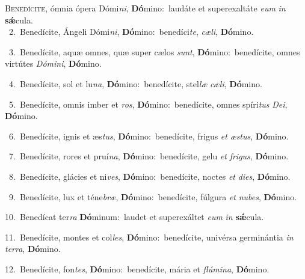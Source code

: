 \lettrine{\initial\textcolor{\initialcolor}{B}}{enedícite,} ómnia ópera Dómi\-\textit{ni}\-, \textbf{Dó}\-mino:~\star laudáte et superexaltáte \textit{e}\-\textit{um} \textit{in} \textbf{sǽ}\-cula.\\
{\numbfont\textcolor{\numbcolor}{~2.}}~Benedícite, Ángeli Dómi\-\textit{ni}\-, \textbf{Dó}\-mino:~\star benedíci\-\textit{te}\-, \textit{cæ}\-\textit{li}, \textbf{Dó}\-mino.\par
{\numbfont\textcolor{\numbcolor}{~3.}}~Benedícite, aquæ omnes, quæ super cælos \textit{sunt}\-, \textbf{Dó}\-mino:~\star benedícite, omnes virtútes \textit{Dó}\-\textit{mi}\textit{ni}, \textbf{Dó}\-mino.\par
{\numbfont\textcolor{\numbcolor}{~4.}}~Benedícite, sol et lu\-\textit{na}\-, \textbf{Dó}\-mino:~\star benedícite, stel\textit{læ} \textit{cæ}\-\textit{li}, \textbf{Dó}\-mino.\par
{\numbfont\textcolor{\numbcolor}{~5.}}~Benedícite, omnis imber et \textit{ros}\-, \textbf{Dó}\-mino:~\star benedícite, omnes spíri\textit{tus} \textit{De}\-\textit{i}, \textbf{Dó}\-mino.\par
{\numbfont\textcolor{\numbcolor}{~6.}}~Benedícite, ignis et æs\-\textit{tus}\-, \textbf{Dó}\-mino:~\star benedícite, frigus \textit{et} \textit{æs}\-\textit{tus}, \textbf{Dó}\-mino.\par
{\numbfont\textcolor{\numbcolor}{~7.}}~Benedícite, rores et pruí\-\textit{na}\-, \textbf{Dó}\-mino:~\star benedícite, gelu \textit{et} \textit{fri}\-\textit{gus}, \textbf{Dó}\-mino.\par
{\numbfont\textcolor{\numbcolor}{~8.}}~Benedícite, glácies et ni\-\textit{ves}\-, \textbf{Dó}\-mino:~\star benedícite, noctes \textit{et} \textit{di}\-\textit{es}, \textbf{Dó}\-mino.\par
{\numbfont\textcolor{\numbcolor}{~9.}}~Benedícite, lux et téne\-\textit{bræ}\-, \textbf{Dó}\-mino:~\star benedícite, fúlgura \textit{et} \textit{nu}\-\textit{bes}, \textbf{Dó}\-mino.\par
{\numbfont\textcolor{\numbcolor}{10.}}~Benedícat ter\textit{ra} \textbf{Dó}\-minum:~\star laudet et superexáltet \textit{e}\-\textit{um} \textit{in} \textbf{sǽ}\-cula.\par
{\numbfont\textcolor{\numbcolor}{11.}}~Benedícite, montes et col\-\textit{les}\-, \textbf{Dó}\-mino:~\star benedícite, univérsa germinántia \textit{in} \textit{ter}\-\textit{ra}, \textbf{Dó}\-mino.\par
{\numbfont\textcolor{\numbcolor}{12.}}~Benedícite, fon\-\textit{tes}\-, \textbf{Dó}\-mino:~\star benedícite, mária et \textit{flú}\-\textit{mi}\textit{na}, \textbf{Dó}\-mino.\par
